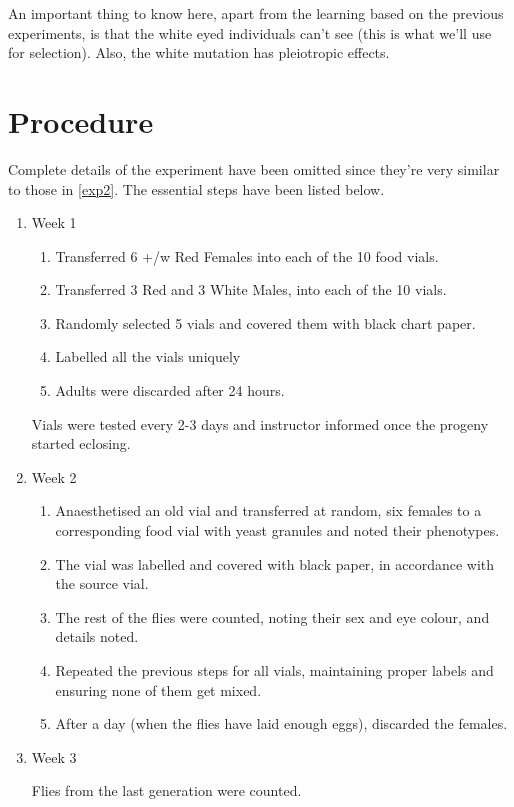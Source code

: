 	An important thing to know here, apart from the learning based on the previous experiments, is that the white eyed individuals can't see (this is what we'll use for selection). Also, the white mutation has pleiotropic effects.

\section{Procedure}
	Complete details of the experiment have been omitted since they're very similar to those in \autoref{exp2}. The essential steps have been listed below.\\
	\begin{enumerate}
	\item Week 1
		\begin{enumerate}
			\item Transferred 6 +/w Red Females into each of the 10 food vials.
			\item Transferred 3 Red and 3 White Males, into each of the 10 vials.
			\item Randomly selected 5 vials and covered them with black chart paper.
			\item Labelled all the vials uniquely
			\item Adults were discarded after 24 hours.
		\end{enumerate}
		Vials were tested every 2-3 days and instructor informed once the progeny started eclosing.\\
	\item Week 2
		\begin{enumerate}
			\item Anaesthetised an old vial and transferred at random, six females to a corresponding food vial with yeast granules and noted their phenotypes.
			\item The vial was labelled and covered with black paper, in accordance with the source vial.
			\item The rest of the flies were counted, noting their sex and eye colour, and details noted.
			\item Repeated the previous steps for all vials, maintaining proper labels and ensuring none of them get mixed.
			\item After a day (when the flies have laid enough eggs), discarded the females.
		\end{enumerate}
	\item Week 3
		\par
		Flies from the last generation were counted.
	\end{enumerate}

